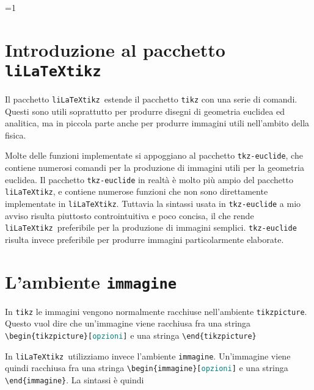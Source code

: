 \documentclass[italian, a4paper]{article}
\def\showimmagini{1} %
\newcommand{\bs}{\textbackslash}
\newcommand{\ttt}[1]{\texttt{#1}}
\newcommand{\liLaTeXtikz}{\ttt{liLaTeXtikz}}
\newcommand{\opzioni}{\textcolor{teal}{\ttt{opzioni}}}
\begin{document}
\ifnum\showimmagini=1
\begin{figure}[!ht]\centering
{}
\end{figure}
\fi

\newpage
\section{Introduzione al pacchetto \liLaTeXtikz}
Il pacchetto \liLaTeXtikz\ estende il pacchetto \ttt{tikz} con una serie di comandi. Questi sono utili soprattutto per produrre disegni di geometria euclidea ed analitica, ma in piccola parte anche per produrre immagini utili nell'ambito della fisica.

Molte delle funzioni implementate si appoggiano al pacchetto \ttt{tkz-euclide}, che contiene numerosi comandi per la produzione di immagini utili per la geometria euclidea. Il pacchetto \ttt{tkz-euclide} in realtà è molto più ampio del pacchetto \liLaTeXtikz, e contiene numerose funzioni che non sono direttamente implementate in \liLaTeXtikz. Tuttavia la sintassi usata in \ttt{tkz-euclide} a mio avviso risulta piuttosto controintuitiva e poco concisa, il che rende \liLaTeXtikz\ preferibile per la produzione di immagini semplici. \ttt{tkz-euclide} risulta invece preferibile per produrre immagini particolarmente elaborate.

\section{L'ambiente \ttt{immagine}}
In \ttt{tikz} le immagini vengono normalmente racchiuse nell'ambiente \ttt{tikzpicture}. Questo vuol dire che un'immagine viene racchiusa fra una stringa \ttt{\bs begin\{tikzpicture\}[\opzioni]} e una stringa \ttt{\bs end\{tikzpicture\}}

In \liLaTeXtikz\ utilizziamo invece l'ambiente \ttt{immagine}. Un'immagine viene quindi racchiusa fra una stringa \ttt{\bs begin\{immagine\}[\opzioni]} e una stringa \ttt{\bs end\{immagine\}}. La sintassi è quindi
\end{document}
